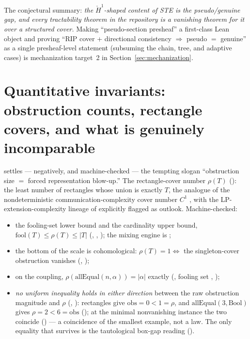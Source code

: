 \documentclass[11pt]{article}
\newcommand{\rectrho}{\rho}
\newcommand{\obs}{\mathrm{obs}}
\newcommand{\Hech}{\check H}
\begin{document}
\noindent
The conjectural summary: \emph{the $\Hech^1$-shaped content of STE is
the pseudo/genuine gap, and every tractability theorem in the
repository is a vanishing theorem for it over a structured cover.}
Making ``pseudo-section presheaf'' a first-class Lean object and
proving ``RIP cover + directional consistency $\Rightarrow$ pseudo
$=$ genuine'' as a single presheaf-level statement (subsuming the
chain, tree, and adaptive cases) is mechanization target~2 in
Section~\ref{sec:mechanization}.

\section{Quantitative invariants: obstruction counts, rectangle
covers, and what is genuinely incomparable}
\label{sec:quant}

 settles --- negatively, and
machine-checked --- the tempting slogan ``obstruction size $=$ forced
representation blow-up.''  The rectangle-cover number $\rectrho(T)$
(): the least number of rectangles whose union
is exactly $T$, the analogue of the nondeterministic
communication-complexity cover number $C^1$
\citep{kushilevitz1997communication,aho1983notions}, with the
LP-extension-complexity lineage of
\citet{yannakakis1991expressing,fiorini2015exponential} explicitly
flagged as outlook.  Machine-checked:

\begin{itemize}
\item the fooling-set lower bound and the cardinality upper bound,
  $\mathrm{fool}(T) \le \rectrho(T) \le |T|$
  (,
  ,
  ); the mixing engine is
  ;
\item the bottom of the scale is cohomological: $\rectrho(T) = 1
  \iff$ the singleton-cover obstruction vanishes
  (,
  );
\item on the coupling, $\rectrho(\mathrm{allEqual}(n,\alpha)) =
  |\alpha|$ exactly (,
  fooling set ,
  );
\item \emph{no uniform inequality holds in either direction} between
  the raw obstruction magnitude and $\rectrho$
  (,
  ): rectangles
  give $\obs = 0 < 1 = \rectrho$, and $\mathrm{allEqual}(3,
  \mathrm{Bool})$ gives $\rectrho = 2 < 6 = \obs$
  (); at the
  minimal nonvanishing instance the two coincide
  () --- a
  coincidence of the smallest example, not a law.  The only equality
  that survives is the tautological box-gap reading
  ().
\end{itemize}
\end{document}
